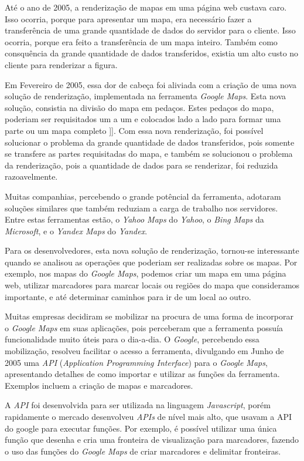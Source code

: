 Até o ano de 2005, a renderização de mapas em uma página web custava caro. Isso ocorria,
porque para apresentar um mapa, era necessário fazer a transferência de uma grande
quantidade de dados do servidor para o cliente. Isso ocorria, porque era feito a
transferência de um mapa inteiro. Também como consquência da grande quantidade de dados
transferidos, existia um alto custo no cliente para renderizar a figura.

Em Fevereiro de 2005, essa dor de cabeça foi aliviada com a criação
de uma nova solução de renderização, implementada na ferramenta \emph{Google Maps}. Esta nova
solução, consistia na divisão do mapa em pedaços. Estes pedaços do mapa, poderiam ser
requisitados um a um e colocados lado a lado para formar uma parte ou um mapa completo
]]. Com essa nova renderização,
foi possível solucionar o problema da grande quantidade de dados transferidos, pois
somente se transfere as partes requisitadas do mapa, e também se solucionou o problema
da renderização, pois a quantidade de dados para se renderizar, foi reduzida razoavelmente.

Muitas companhias, percebendo o grande potêncial da ferramenta, adotaram soluções similares
que também reduziam a carga de trabalho nos servidores. Entre estas ferramentas estão, o
\emph{Yahoo Maps} do \emph{Yahoo}, o \emph{Bing Maps} da \emph{Microsoft}, e o
\emph{Yandex Maps} do \emph{Yandex}.

Para os desenvolvedores, esta nova solução de renderização, tornou-se interessante
quando se analisou as operações que poderiam ser realizadas sobre os mapas. Por exemplo, nos
mapas do \emph{Google Maps}, podemos criar um mapa em uma página web, utilizar marcadores para
marcar locais ou regiões do mapa que consideramos importante, e até determinar caminhos
para ir de um local ao outro.

Muitas empresas decidiram se mobilizar na procura de uma forma de incorporar o
\emph{Google Maps} em suas aplicações, pois perceberam que a ferramenta possuía funcionalidade
muito úteis para o dia-a-dia. O \emph{Google}, percebendo essa mobilização, resolveu facilitar
o acesso a ferramenta, divulgando em Junho de 2005 uma \emph{API}
(\emph{Application Programming Interface}) para o \emph{Google Maps}, apresentando
detalhes de como importar e utilizar as funções da ferramenta. Exemplos incluem a criação de
mapas e marcadores.

A \emph{API} foi desenvolvida para ser utilizada na linguagem \emph{Javascript}, porém rapidamente
o mercado desenvolveu \emph{APIs} de nível mais alto, que usavam a API do google para executar
funções. Por exemplo, é possível utilizar uma única função que desenha e cria uma fronteira
de visualização para marcadores, fazendo o uso das funções do \emph{Google Maps}
de criar marcadores e delimitar fronteiras.

